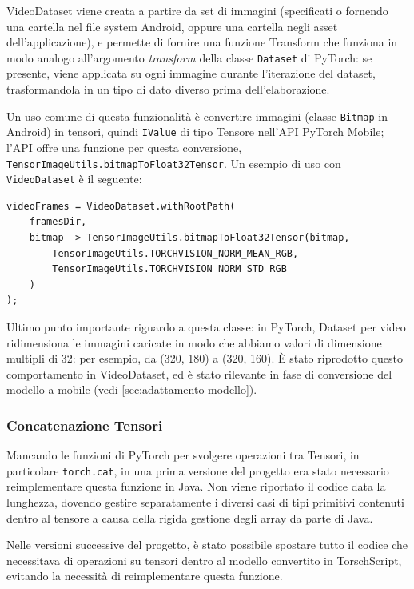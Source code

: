 VideoDataset viene creata a partire da set di immagini (specificati o fornendo una cartella
nel file system Android, oppure una cartella negli asset dell'applicazione), e permette di 
fornire una funzione Transform che funziona in modo analogo all'argomento \emph{transform}
della classe \texttt{Dataset} di PyTorch: se presente, viene applicata su ogni immagine
durante l'iterazione del dataset, trasformandola in un tipo di dato diverso prima 
dell'elaborazione. 

Un uso comune di questa funzionalità è convertire immagini (classe
\texttt{Bitmap} in Android) in tensori, quindi \texttt{IValue} di tipo Tensore nell'API
PyTorch Mobile; l'API offre una funzione per questa conversione, 
\texttt{TensorImageUtils.bitmapToFloat32Tensor}. Un esempio di uso con \texttt{VideoDataset} 
è il seguente:

\begin{lstlisting}
videoFrames = VideoDataset.withRootPath(
    framesDir, 
    bitmap -> TensorImageUtils.bitmapToFloat32Tensor(bitmap,
        TensorImageUtils.TORCHVISION_NORM_MEAN_RGB,
        TensorImageUtils.TORCHVISION_NORM_STD_RGB
    )
);
\end{lstlisting}

Ultimo punto importante riguardo a questa classe: in PyTorch, Dataset per video ridimensiona
le immagini caricate in modo che abbiamo valori di dimensione multipli di 32: per esempio, 
da (320, 180) a (320, 160). È stato riprodotto questo comportamento in VideoDataset, ed è stato
rilevante in fase di conversione del modello a mobile (vedi \ref{sec:adattamento-modello}).

\subsubsection*{Concatenazione Tensori}

Mancando le funzioni di PyTorch per svolgere operazioni tra Tensori, in particolare
\texttt{torch.cat}, in una prima versione del progetto era stato necessario reimplementare
questa funzione in Java. Non viene riportato il codice data la lunghezza, dovendo gestire 
separatamente i diversi casi di tipi primitivi contenuti dentro al tensore a causa della rigida
gestione degli array da parte di Java.

Nelle versioni successive del progetto, è stato possibile spostare tutto il codice che
necessitava di operazioni su tensori dentro al modello convertito in TorschScript, evitando
la necessità di reimplementare questa funzione.

